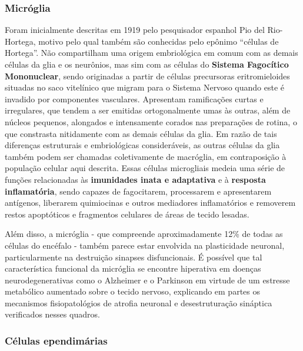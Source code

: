 \documentclass[
]{book}
\theoremstyle{definition}
\theoremstyle{definition}
\theoremstyle{definition}
\theoremstyle{definition}
\theoremstyle{remark}
\begin{document}
\hypertarget{micruxf3glia}{%
\subsubsection*{Micróglia}\label{micruxf3glia}}

Foram inicialmente descritas em 1919 pelo pesquisador espanhol Pio del Rio-Hortega, motivo pelo qual também são conhecidas pelo epônimo ``células de Hortega''. Não compartilham uma origem embriológica em comum com as demais células da glia e os neurônios, mas sim com as células do \textbf{Sistema Fagocítico Mononuclear}, sendo originadas a partir de células precursoras eritromieloides situadas no saco vitelínico que migram para o Sistema Nervoso quando este é invadido por componentes vasculares. Apresentam ramificações curtas e irregulares, que tendem a ser emitidas ortogonalmente umas às outras, além de núcleos pequenos, alongados e intensamente corados nas preparações de rotina, o que constrasta nitidamente com as demais células da glia. Em razão de tais diferenças estruturais e embriológicas consideráveis, as outras células da glia também podem ser chamadas coletivamente de macróglia, em contraposição à população celular aqui descrita. Essas células microgliais medeia uma série de funções relacionadas às \textbf{imunidades inata e adaptativa} e à \textbf{resposta inflamatória}, sendo capazes de fagocitarem, processarem e apresentarem antígenos, liberarem quimiocinas e outros mediadores inflamatórios e removerem restos apoptóticos e fragmentos celulares de áreas de tecido lesadas.

Além disso, a micróglia - que compreende aproximadamente 12\% de todas as células do encéfalo - também parece estar envolvida na plasticidade neuronal, particularmente na destruição sinapses disfuncionais. É possível que tal característica funcional da micróglia se encontre hiperativa em doenças neurodegenerativas como o Alzheimer e o Parkinson em virtude de um estresse metabólico aumentado sobre o tecido nervoso, explicando em partes os mecanismos fisiopatológios de atrofia neuronal e desestruturação sináptica verificados nesses quadros.

\hypertarget{cuxe9lulas-ependimuxe1rias}{%
\subsubsection*{Células ependimárias}\label{cuxe9lulas-ependimuxe1rias}}
\end{document}
